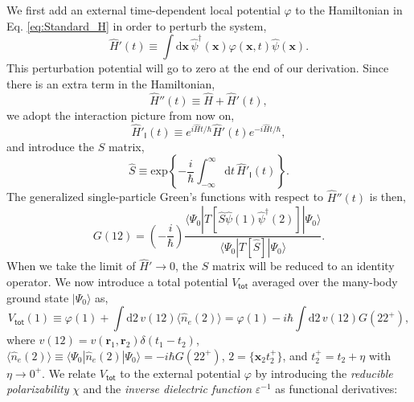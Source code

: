 \documentclass[11pt, oneside]{article}          %
\begin{document}
We first add an external time-dependent local potential $\varphi$ to the Hamiltonian in Eq. \eqref{eq:Standard_H} in order to perturb the system,
\begin{equation}
  \label{eq:Hp_perturb}
  \hat{H}' (t) \equiv \int \mathrm{d}{\bm x} \, \hat{\psi}^{\dagger}({\bm x}) \varphi({\bm x}, t) \hat{\psi}({\bm x}).
\end{equation}
This perturbation potential will go to zero at the end of our derivation. Since there is an extra term in the Hamiltonian,
\begin{equation}
  \label{eq:Hamiltonian_more}
  \hat{H}''(t) \equiv \hat{H} + \hat{H}'(t),
\end{equation}
we adopt the interaction picture from now on,
\begin{equation}
  \label{eq:H_interaction}
  \hat{H}'_{\mathsf{I}}(t) \equiv e^{i \hat{H}t /\hbar} \hat{H}'(t) e^{-i \hat{H} t /\hbar},
\end{equation}
and introduce the $S$ matrix,
\begin{equation}
  \hat{S} \equiv \text{exp} \left \{ -\frac{i}{\hbar} \int^{\infty}_{-\infty} \mathrm{d} t \, \hat{H}'_{\mathsf{I}} (t) \right \}.
\end{equation}
The generalized single-particle Green's functions with respect to $\hat{H}''(t)$ is then,
\begin{equation}
  G(12) = \left ( - \frac{i}{\hbar} \right ) \frac{\langle \Psi_0 | T[\hat{S} \hat{\psi}(1) \hat{\psi}^{\dagger}(2)] | \Psi_0 \rangle}{\langle \Psi_0 | T[\hat{S}] | \Psi_0 \rangle}.
\end{equation}
When we take the limit of $\hat{H}' \rightarrow 0$, the $S$ matrix will be reduced to an identity operator. We now introduce a total potential $V_{\mathsf{tot}}$ averaged over the many-body ground state $| \Psi_0 \rangle$ as,
\begin{equation}
  \label{eq:V_tot_b}
  V_{\mathsf{tot}}(1) \equiv \varphi(1) + \int \mathrm{d}2 \, v(12) \langle \hat{n}_e(2)\rangle = \varphi(1) - i \hbar \int \mathrm{d}2 \, v(12) G(22^{+}),
\end{equation}
where $v(12) = v({\bm r}_1,{\bm r}_2) \delta(t_1 - t_2)$, $\langle \hat{n}_e (2) \rangle \equiv \langle \Psi_0 | \hat{n}_e(2) | \Psi_0 \rangle = -i \hbar G(22^{+})$, $2=\{ {\bm x}_2 t^{+}_2 \}$, and $t^{+}_2 = t_2 + \eta$ with $\eta \rightarrow 0^{+}$. We relate $V_{\mathsf{tot}}$ to the external potential $\varphi$ by introducing the \emph{reducible polarizability} $\chi$ and the \emph{inverse dielectric function} $\varepsilon^{-1}$ as functional derivatives:
\end{document}
